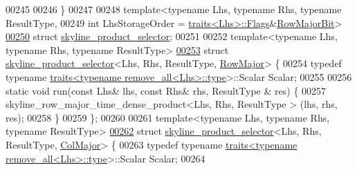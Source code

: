\begin{DoxyCode}
00245 
00246 \}
00247 
00248 \textcolor{keyword}{template}<\textcolor{keyword}{typename} Lhs, \textcolor{keyword}{typename} Rhs, \textcolor{keyword}{typename} ResultType,
00249         \textcolor{keywordtype}{int} LhsStorageOrder = \hyperlink{struct_eigen_1_1internal_1_1traits}{traits<Lhs>::Flags}&\hyperlink{group__flags_gae4f56c2a60bbe4bd2e44c5b19cbe8762}{RowMajorBit}>
\hyperlink{struct_eigen_1_1internal_1_1skyline__product__selector}{00250}         \textcolor{keyword}{struct }\hyperlink{struct_eigen_1_1internal_1_1skyline__product__selector}{skyline\_product\_selector};
00251 
00252 \textcolor{keyword}{template}<\textcolor{keyword}{typename} Lhs, \textcolor{keyword}{typename} Rhs, \textcolor{keyword}{typename} ResultType>
\hyperlink{struct_eigen_1_1internal_1_1skyline__product__selector_3_01_lhs_00_01_rhs_00_01_result_type_00_01_row_major_01_4}{00253} \textcolor{keyword}{struct }\hyperlink{struct_eigen_1_1internal_1_1skyline__product__selector}{skyline\_product\_selector}<Lhs, Rhs, ResultType, 
      \hyperlink{group__enums_ggaacded1a18ae58b0f554751f6cdf9eb13acfcde9cd8677c5f7caf6bd603666aae3}{RowMajor}> \{
00254     \textcolor{keyword}{typedef} \textcolor{keyword}{typename} \hyperlink{struct_eigen_1_1internal_1_1traits}{traits<typename remove\_all<Lhs>::type}>::Scalar 
      Scalar;
00255 
00256     \textcolor{keyword}{static} \textcolor{keywordtype}{void} run(\textcolor{keyword}{const} Lhs& lhs, \textcolor{keyword}{const} Rhs& rhs, ResultType & res) \{
00257         skyline\_row\_major\_time\_dense\_product<Lhs, Rhs, ResultType > (lhs, rhs, res);
00258     \}
00259 \};
00260 
00261 \textcolor{keyword}{template}<\textcolor{keyword}{typename} Lhs, \textcolor{keyword}{typename} Rhs, \textcolor{keyword}{typename} ResultType>
\hyperlink{struct_eigen_1_1internal_1_1skyline__product__selector_3_01_lhs_00_01_rhs_00_01_result_type_00_01_col_major_01_4}{00262} \textcolor{keyword}{struct }\hyperlink{struct_eigen_1_1internal_1_1skyline__product__selector}{skyline\_product\_selector}<Lhs, Rhs, ResultType, 
      \hyperlink{group__enums_ggaacded1a18ae58b0f554751f6cdf9eb13a0cbd4bdd0abcfc0224c5fcb5e4f6669a}{ColMajor}> \{
00263     \textcolor{keyword}{typedef} \textcolor{keyword}{typename} \hyperlink{struct_eigen_1_1internal_1_1traits}{traits<typename remove\_all<Lhs>::type}>::Scalar 
      Scalar;
00264 

\end{DoxyCode}
